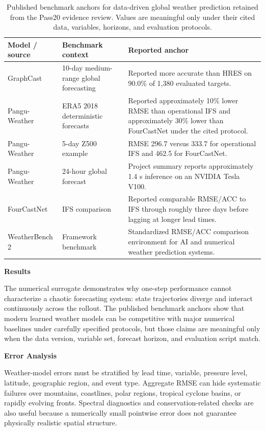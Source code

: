 \begin{table}[t]
\centering
\small
\caption{Published benchmark anchors for data-driven global weather prediction retained from the Pass20 evidence review. Values are meaningful only under their cited data, variables, horizons, and evaluation protocols.}
\label{tab:ch1-weather-benchmark}
\begin{tabular}{p{}p{}p{}}
\toprule
Model / source & Benchmark context & Reported anchor \\
\midrule
GraphCast & 10-day medium-range global forecasting & Reported more accurate than HRES on 90.0\% of 1,380 evaluated targets. \\
Pangu-Weather & ERA5 2018 deterministic forecasts & Reported approximately 10\% lower RMSE than operational IFS and approximately 30\% lower than FourCastNet under the cited protocol. \\
Pangu-Weather & 5-day Z500 example & RMSE 296.7 versus 333.7 for operational IFS and 462.5 for FourCastNet. \\
Pangu-Weather & 24-hour global forecast & Project summary reports approximately 1.4 s inference on an NVIDIA Tesla V100. \\
FourCastNet & IFS comparison & Reported comparable RMSE/ACC to IFS through roughly three days before lagging at longer lead times. \\
WeatherBench 2 & Framework benchmark & Standardized RMSE/ACC comparison environment for AI and numerical weather prediction systems. \\
\bottomrule
\end{tabular}
\end{table}

\textbf{Results}

The numerical surrogate demonstrates why one-step performance cannot characterize a chaotic forecasting system: state trajectories diverge and interact continuously across the rollout. The published benchmark anchors show that modern learned weather models can be competitive with major numerical baselines under carefully specified protocols, but those claims are meaningful only when the data version, variable set, forecast horizon, and evaluation script match.

\textbf{Error Analysis}

Weather-model errors must be stratified by lead time, variable, pressure level, latitude, geographic region, and event type. Aggregate RMSE can hide systematic failures over mountains, coastlines, polar regions, tropical cyclone basins, or rapidly evolving fronts. Spectral diagnostics and conservation-related checks are also useful because a numerically small pointwise error does not guarantee physically realistic spatial structure.

